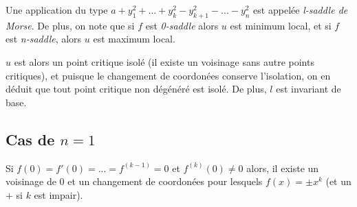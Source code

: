 \documentclass{article}
\begin{document}
Une application du type $a+y_1^2+...+y_k^2-y_{k+1}^2-...-y_n^2$ est appelée \textit{l-saddle de Morse}. De plus, on note que si $f$ est \textit{0-saddle} alors $u$ est minimum local, et si $f$ est \textit{n-saddle}, alors $u$ est maximum local.

$u$ est alors un point critique isolé (il existe un voisinage sans autre points critiques), et puisque le changement de coordonées conserve l'isolation, on en déduit que tout point critique non dégénéré est isolé. De plus, $l$ est invariant de base.

\subsection{Cas de $n=1$}

Si $f(0)=f'(0)=...=f^{(k-1)}=0$ et $f^{(k)}(0)\neq 0$ alors, il existe un voisinage de 0 et un changement de coordonées pour lesquels $f(x)=\pm x^k$ (et un $+$ si $k$ est impair).
\end{document}
